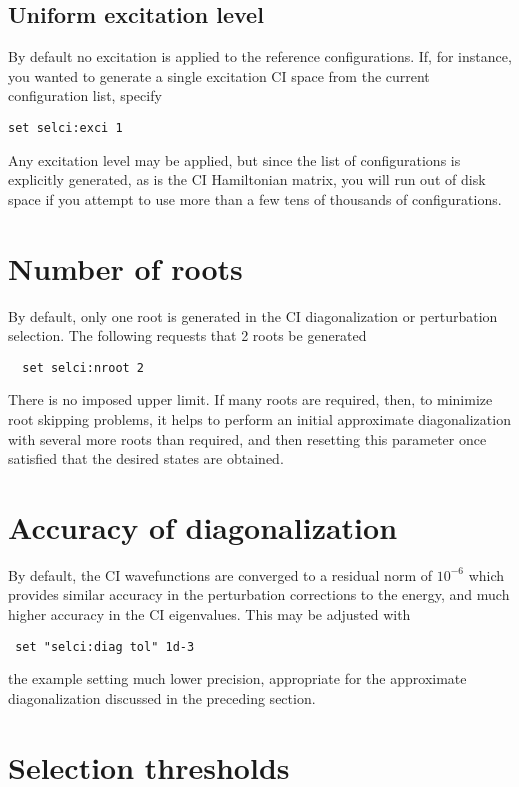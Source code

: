 \subsection{Uniform excitation level}

By default no excitation is applied to the reference configurations.
If, for instance, you wanted to generate a single excitation CI space
from the current configuration list, specify
\begin{verbatim}
set selci:exci 1
\end{verbatim}
Any excitation level may be applied, but since the list of
configurations is explicitly generated, as is the CI Hamiltonian
matrix, you will run out of disk space if you attempt to use more than
a few tens of thousands of configurations.

\section{Number of roots}

By default, only one root is generated in the CI diagonalization or
perturbation selection.  The following requests that 2 roots be
generated
\begin{verbatim}
  set selci:nroot 2
\end{verbatim}
There is no imposed upper limit.  If many roots are required, then, to
minimize root skipping problems, it helps to perform an initial
approximate diagonalization with several more roots than required, and
then resetting this parameter once satisfied that the desired
states are obtained.

\section{Accuracy of diagonalization}

By default, the CI wavefunctions are converged to a residual norm of
$10^{-6}$ which provides similar accuracy in the perturbation
corrections to the energy, and much higher accuracy in the CI
eigenvalues.  This may be adjusted with
\begin{verbatim}
 set "selci:diag tol" 1d-3
\end{verbatim}
the example setting much lower precision, appropriate for the
approximate diagonalization discussed in the preceding section.

\section{Selection thresholds}

